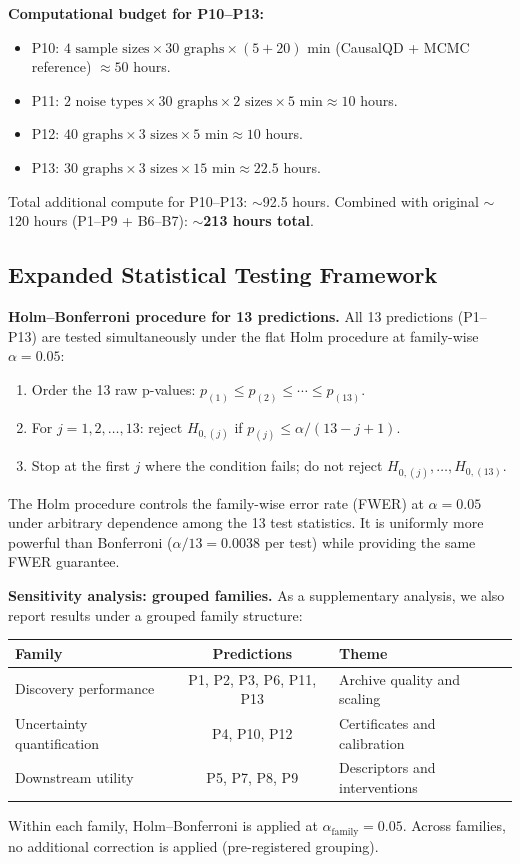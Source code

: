 \documentclass{article}
\theoremstyle{definition}
\theoremstyle{plain}
\theoremstyle{remark}
\begin{document}
\textbf{Computational budget for P10--P13:}
\begin{itemize}
  \item P10: $4 \text{ sample sizes} \times 30 \text{ graphs} \times
    (5 + 20) \text{ min}$ (CausalQD + MCMC reference) $\approx 50$ hours.
  \item P11: $2 \text{ noise types} \times 30 \text{ graphs} \times
    2 \text{ sizes} \times 5 \text{ min} \approx 10$ hours.
  \item P12: $40 \text{ graphs} \times 3 \text{ sizes} \times
    5 \text{ min} \approx 10$ hours.
  \item P13: $30 \text{ graphs} \times 3 \text{ sizes} \times
    15 \text{ min} \approx 22.5$ hours.
\end{itemize}
Total additional compute for P10--P13: $\sim$92.5 hours.
Combined with original $\sim$120 hours (P1--P9 + B6--B7):
\textbf{$\sim$213 hours total}.


\subsection*{Expanded Statistical Testing Framework}

\textbf{Holm--Bonferroni procedure for 13 predictions.} All 13
predictions (P1--P13) are tested simultaneously under the flat Holm
procedure at family-wise $\alpha = 0.05$:
\begin{enumerate}
  \item Order the 13 raw p-values: $p_{(1)} \leq p_{(2)} \leq \cdots
    \leq p_{(13)}$.
  \item For $j = 1, 2, \ldots, 13$: reject $H_{0,(j)}$ if
    $p_{(j)} \leq \alpha / (13 - j + 1)$.
  \item Stop at the first $j$ where the condition fails; do not reject
    $H_{0,(j)}, \ldots, H_{0,(13)}$.
\end{enumerate}
The Holm procedure controls the family-wise error rate (FWER) at
$\alpha = 0.05$ under arbitrary dependence among the 13 test statistics.
It is uniformly more powerful than Bonferroni ($\alpha / 13 = 0.0038$
per test) while providing the same FWER guarantee.

\textbf{Sensitivity analysis: grouped families.} As a supplementary
analysis, we also report results under a grouped family structure:
\begin{center}
\begin{tabular}{lcl}
\toprule
\textbf{Family} & \textbf{Predictions} & \textbf{Theme} \\
\midrule
Discovery performance & P1, P2, P3, P6, P11, P13 & Archive quality and scaling \\
Uncertainty quantification & P4, P10, P12 & Certificates and calibration \\
Downstream utility & P5, P7, P8, P9 & Descriptors and interventions \\
\bottomrule
\end{tabular}
\end{center}
Within each family, Holm--Bonferroni is applied at
$\alpha_{\mathrm{family}} = 0.05$. Across families, no additional
correction is applied (pre-registered grouping).
\end{document}
